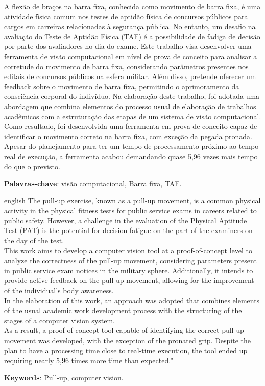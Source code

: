 \documentclass[
	12pt,			%
	openany,		%
	oneside,		%
	a4paper,		%
	english,		%
	brazil			%
	]{abntex2}
\begin{document}
\begin{resumo}
	A flexão de braços na barra fixa, conhecida como movimento de barra fixa, é uma atividade física comum nos testes de aptidão física de concursos públicos para cargos em carreiras relacionadas à segurança pública. No entanto, um desafio na avaliação do Teste de Aptidão Física (TAF) é a possibilidade de fadiga de decisão por parte dos avaliadores no dia do exame.
	Este trabalho visa desenvolver uma ferramenta de visão computacional em nível de prova de conceito para analisar a corretude do movimento de barra fixa, considerando parâmetros presentes nos editais de concursos públicos na esfera militar. Além disso, pretende oferecer um feedback sobre o movimento de barra fixa, permitindo o aprimoramento da consciência corporal do indivíduo.
	Na elaboração deste trabalho, foi adotada uma abordagem que combina elementos do processo usual de elaboração de trabalhos acadêmicos com a estruturação das etapas de um sistema de visão computacional.
	Como resultado, foi desenvolvida uma ferramenta em prova de conceito capaz de identificar o movimento correto na barra fixa, com exceção da pegada pronada. Apesar do planejamento para ter um tempo de processamento próximo ao tempo real de execução, a ferramenta acabou demandando quase 5,96 vezes mais tempo do que o previsto.
 
 \textbf{Palavras-chave}: visão computacional, Barra fixa, TAF.
\end{resumo}

\begin{resumo}[Abstract]
 \begin{otherlanguage*}{english}
	The pull-up exercise, known as a pull-up movement, is a common physical activity in the physical fitness tests for public service exams in careers related to public safety. However, a challenge in the evaluation of the Physical Aptitude Test (PAT) is the potential for decision fatigue on the part of the examiners on the day of the test.\\
	This work aims to develop a computer vision tool at a proof-of-concept level to analyze the correctness of the pull-up movement, considering parameters present in public service exam notices in the military sphere. Additionally, it intends to provide active feedback on the pull-up movement, allowing for the improvement of the individual's body awareness.\\
	In the elaboration of this work, an approach was adopted that combines elements of the usual academic work development process with the structuring of the stages of a computer vision system.\\	
	As a result, a proof-of-concept tool capable of identifying the correct pull-up movement was developed, with the exception of the pronated grip. Despite the plan to have a processing time close to real-time execution, the tool ended up requiring nearly 5,96 times more time than expected."

 \textbf{Keywords}: Pull-up, computer vision.
 \end{otherlanguage*}
\end{resumo}
\end{document}
